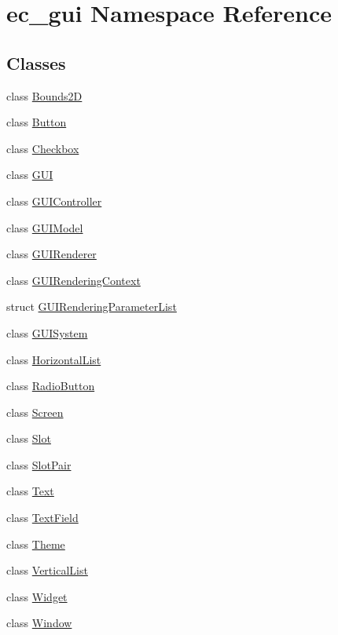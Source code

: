 \hypertarget{namespaceec__gui}{}\section{ec\+\_\+gui Namespace Reference}
\label{namespaceec__gui}
\subsection*{Classes}
\begin{DoxyCompactItemize}
\item 
class \mbox{\hyperlink{classec__gui_1_1_bounds2_d}{Bounds2D}}
\item 
class \mbox{\hyperlink{classec__gui_1_1_button}{Button}}
\item 
class \mbox{\hyperlink{classec__gui_1_1_checkbox}{Checkbox}}
\item 
class \mbox{\hyperlink{classec__gui_1_1_g_u_i}{G\+UI}}
\item 
class \mbox{\hyperlink{classec__gui_1_1_g_u_i_controller}{G\+U\+I\+Controller}}
\item 
class \mbox{\hyperlink{classec__gui_1_1_g_u_i_model}{G\+U\+I\+Model}}
\item 
class \mbox{\hyperlink{classec__gui_1_1_g_u_i_renderer}{G\+U\+I\+Renderer}}
\item 
class \mbox{\hyperlink{classec__gui_1_1_g_u_i_rendering_context}{G\+U\+I\+Rendering\+Context}}
\item 
struct \mbox{\hyperlink{structec__gui_1_1_g_u_i_rendering_parameter_list}{G\+U\+I\+Rendering\+Parameter\+List}}
\item 
class \mbox{\hyperlink{classec__gui_1_1_g_u_i_system}{G\+U\+I\+System}}
\item 
class \mbox{\hyperlink{classec__gui_1_1_horizontal_list}{Horizontal\+List}}
\item 
class \mbox{\hyperlink{classec__gui_1_1_radio_button}{Radio\+Button}}
\item 
class \mbox{\hyperlink{classec__gui_1_1_screen}{Screen}}
\item 
class \mbox{\hyperlink{classec__gui_1_1_slot}{Slot}}
\item 
class \mbox{\hyperlink{classec__gui_1_1_slot_pair}{Slot\+Pair}}
\item 
class \mbox{\hyperlink{classec__gui_1_1_text}{Text}}
\item 
class \mbox{\hyperlink{classec__gui_1_1_text_field}{Text\+Field}}
\item 
class \mbox{\hyperlink{classec__gui_1_1_theme}{Theme}}
\item 
class \mbox{\hyperlink{classec__gui_1_1_vertical_list}{Vertical\+List}}
\item 
class \mbox{\hyperlink{classec__gui_1_1_widget}{Widget}}
\item 
class \mbox{\hyperlink{classec__gui_1_1_window}{Window}}
\end{DoxyCompactItemize}
